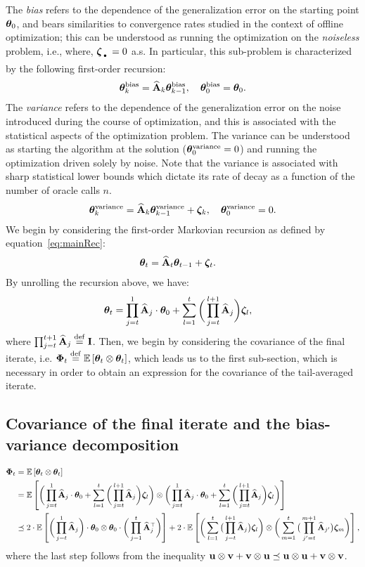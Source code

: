 The {\em bias} refers to the dependence of the generalization error on the starting point $\boldsymbol{\theta}_0$, and bears similarities to convergence rates studied in the context of offline optimization; this can be understood as running the optimization on the {\em noiseless} problem, i.e., where, $\zetav_{\Bigcdot}=0$ a.s. In particular, this sub-problem is characterized by the following first-order recursion:
\begin{align}
\label{eq:biasRec}
\boldsymbol{\theta}_k^{\text{bias}} = \widehat{\mathbf{A}}_k\boldsymbol{\theta}_{k-1}^{\text{bias}},\quad \boldsymbol{\theta}_0^{\text{bias}}=\boldsymbol{\theta}_0.
\end{align} 
The {\em variance} refers to the dependence of the generalization error on the noise introduced during the course of optimization, and this is associated with the statistical aspects of the optimization problem. The variance can be understood as starting the algorithm at the solution ($\boldsymbol{\theta}_0^{\text{variance}}=0$) and running the optimization driven solely by noise. Note that the variance is associated with sharp statistical lower bounds which dictate its rate of decay as a function of the number of oracle calls $n$.
\begin{align}
\label{eq:varianceRec}
\boldsymbol{\theta}_k^{\text{variance}} = \widehat{\mathbf{A}}_k\boldsymbol{\theta}_{k-1}^{\text{variance}} + \boldsymbol{\zeta}_k, \quad \boldsymbol{\theta}_0^{\text{variance}}=0.
\end{align} 
\iffalse
We begin by considering the first-order Markovian recursion as defined by equation~\ref{eq:mainRec}:
\begin{align*}
\boldsymbol{\theta}_t&=\widehat{\mathbf{A}}_t\boldsymbol{\theta}_{t-1}+\boldsymbol{\zeta}_t.
\end{align*}
By unrolling the recursion above, we have:
\begin{align*}
\boldsymbol{\theta}_t&=\prod_{j=t}^{1}\widehat{\mathbf{A}}_j\cdot\boldsymbol{\theta}_0+\sum_{l=1}^t\bigg(\prod_{j=t}^{l+1}\widehat{\mathbf{A}}_j\bigg)\boldsymbol{\zeta}_l,
\end{align*}
where $\prod_{j=t}^{t+1}\widehat{\mathbf{A}}_j \stackrel{\mathrm{def}}{=} \mathbf{I}$. Then, we begin by considering the covariance of the final iterate, i.e. $\boldsymbol{\Phi}_t\stackrel{\mathrm{def}}{=}\mathbb{E}\left[\boldsymbol{\theta}_t\otimes\boldsymbol{\theta}_t\right]$, which leads us to the first sub-section, which is necessary in order to obtain an expression for the covariance of the tail-averaged iterate. 
\subsection{Covariance of the final iterate and the bias-variance decomposition}
\begin{align}
\label{eq:lpRec}
\boldsymbol{\Phi}_t&=\mathbb{E}\left[\boldsymbol{\theta}_t\otimes\boldsymbol{\theta}_t\right]\nonumber\\
&=\mathbb{E}\left[\bigg(\prod_{j=t}^{1}\widehat{\mathbf{A}}_j\cdot\boldsymbol{\theta}_0+\sum_{l=1}^t\bigg(\prod_{j=t}^{l+1}\widehat{\mathbf{A}}_j\bigg)\boldsymbol{\zeta}_l\bigg)\otimes\bigg(\prod_{j=t}^{1}\widehat{\mathbf{A}}_j\cdot\boldsymbol{\theta}_0+\sum_{l=1}^t\bigg(\prod_{j=t}^{l+1}\widehat{\mathbf{A}}_j\bigg)\boldsymbol{\zeta}_l\bigg)\right]\nonumber\\
&\preceq2\cdot\mathbb{E}\left[\bigg(\prod_{j=t}^{1}\widehat{\mathbf{A}}_j\bigg)\cdot\boldsymbol{\theta}_0\otimes\boldsymbol{\theta}_0\cdot\bigg(\prod_{j=1}^{t}\widehat{\mathbf{A}}_j^{\top}\bigg)\right]
+2\cdot\mathbb{E}\left[\bigg(\sum_{l=1}^t\big(\prod_{j=t}^{l+1}\widehat{\mathbf{A}}_j\big)\boldsymbol{\zeta}_l\bigg)\otimes\bigg(\sum_{m=1}^t\big(\prod_{j'=t}^{m+1}\widehat{\mathbf{A}}_{j'}\big)\boldsymbol{\zeta}_m\bigg)\right],
\end{align}
where the last step follows from the inequality $\mathbf{u} \otimes \mathbf{v} + \mathbf{v} \otimes \mathbf{u} \preceq \mathbf{u} \otimes \mathbf{u} + \mathbf{v} \otimes \mathbf{v}$. 


